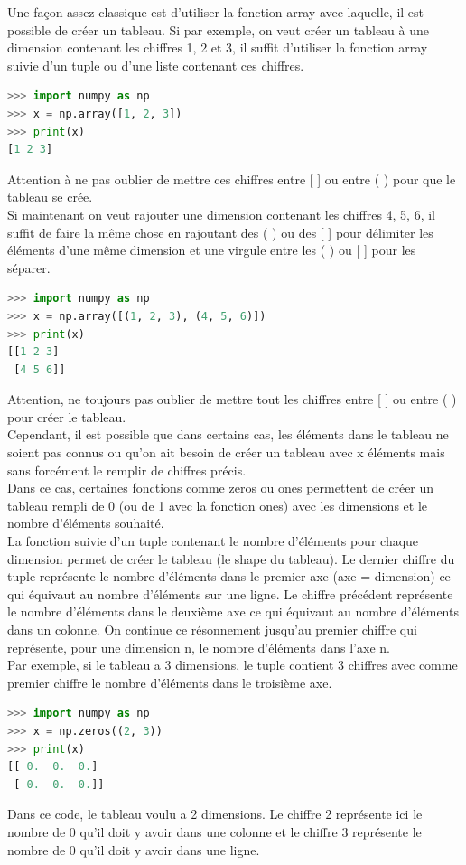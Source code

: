 \documentclass[a4paper, 12pt]{article}
\numberwithin{equation}{subsection}
\begin{document}
Une façon assez classique est d’utiliser la fonction array avec laquelle, il est possible de créer un tableau. Si par exemple, on veut créer un tableau à une dimension contenant les chiffres 1, 2 et 3, il suffit d’utiliser la fonction array suivie d’un tuple ou d’une liste contenant ces chiffres.
\begin{lstlisting}[language=Python]
>>> import numpy as np
>>> x = np.array([1, 2, 3])
>>> print(x)
[1 2 3]
\end{lstlisting}
Attention à ne pas oublier de mettre ces chiffres entre [ ] ou entre ( ) pour que le tableau se crée. \\

Si maintenant on veut rajouter une dimension contenant les chiffres 4, 5, 6, il suffit de faire la même chose en rajoutant des ( ) ou des [ ] pour délimiter les éléments d’une même dimension et une virgule entre les ( ) ou [ ] pour les séparer.
\begin{lstlisting}[language=Python]
>>> import numpy as np
>>> x = np.array([(1, 2, 3), (4, 5, 6)])
>>> print(x)
[[1 2 3]
 [4 5 6]]
\end{lstlisting}
Attention, ne toujours pas oublier de mettre tout les chiffres entre [ ] ou entre ( ) pour créer le tableau. \\

Cependant, il est possible que dans certains cas, les éléments dans le tableau ne soient pas connus ou qu’on ait besoin de créer un tableau avec x éléments mais sans forcément le remplir de chiffres précis. \\

Dans ce cas, certaines fonctions comme zeros ou ones permettent de créer un tableau rempli de 0 (ou de 1 avec la fonction ones) avec les dimensions et le nombre d’éléments souhaité. \\

La fonction suivie d’un tuple contenant le nombre d’éléments pour chaque dimension permet de créer le tableau (le shape du tableau). Le dernier chiffre du tuple représente le nombre d’éléments dans le premier axe (axe = dimension) ce qui équivaut au nombre d’éléments sur une ligne. Le chiffre précédent représente le nombre d’éléments dans le deuxième axe ce qui équivaut au nombre d’éléments dans un colonne. On continue ce résonnement jusqu’au premier chiffre qui représente, pour une dimension n, le nombre d’éléments dans l’axe n. \\

Par exemple, si le tableau a 3 dimensions, le tuple contient 3 chiffres avec comme premier chiffre le nombre d’éléments dans le troisième axe.
\begin{lstlisting}[language=Python]
>>> import numpy as np
>>> x = np.zeros((2, 3))
>>> print(x)
[[ 0.  0.  0.]
 [ 0.  0.  0.]]
\end{lstlisting}
Dans ce code, le tableau voulu a 2 dimensions. Le chiffre 2 représente ici le nombre de 0 qu’il doit y avoir dans une colonne et le chiffre 3 représente le nombre de 0 qu’il doit y avoir dans une ligne. \\
\end{document}
